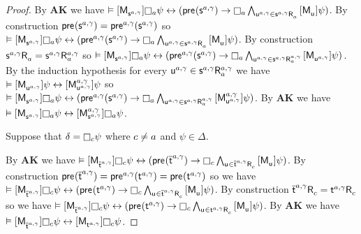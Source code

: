 \begin{proof}
By {\bf AK} we have $\entails \actionA{\aPModel{\aStateS[\agentA, \gamma]}} \necessaryA \psi \iff (\aPrecondition(\aStateS[\agentA, \gamma]) \implies \necessaryA \bigwedge_{\aStateU[\agentA, \gamma] \in \aSuccessorsA{\aStateS[\agentA, \gamma]}} \actionA{\aPModel{\aStateU}} \psi)$.
By construction $\aPrecondition(\aStateS[\agentA, \gamma]) = \aPrecondition[\agentA, \gamma](\aStateS[\agentA, \gamma])$ so $\entails \actionA{\aPModel{\aStateS[\agentA, \gamma]}} \necessaryA \psi \iff (\aPrecondition[\agentA, \gamma](\aStateS[\agentA, \gamma]) \implies \necessaryA \bigwedge_{\aStateU[\agentA, \gamma] \in \aSuccessorsA{\aStateS[\agentA, \gamma]}} \actionA{\aPModel{\aStateU}} \psi)$.
By construction $\aSuccessorsA{\aStateS[\agentA, \gamma]} = \aSuccessorsA[\agentA, \gamma]{\aStateS[\agentA, \gamma]}$ so $\entails \actionA{\aPModel{\aStateS[\agentA, \gamma]}} \necessaryA \psi \iff (\aPrecondition[\agentA, \gamma](\aStateS[\agentA, \gamma]) \implies \necessaryA \bigwedge_{\aStateU[\agentA, \gamma] \in \aSuccessorsA[\agentA, \gamma]{\aStateS[\agentA, \gamma]}} \actionA{\aPModel{\aStateU[\agentA, \gamma]}} \psi)$.
By the induction hypothesis for every $\aStateU[\agentA, \gamma] \in \aSuccessorsA[\agentA, \gamma]{\aStateS[\agentA, \gamma]}$ we have $\entails \actionA{\aPModel{\aStateU[\agentA, \gamma]}} \psi \iff \actionA{\aPModel[\agentA, \gamma]{\aStateU[\agentA, \gamma]}} \psi$ so $\entails \actionA{\aPModel{\aStateS[\agentA, \gamma]}} \necessaryA \psi \iff (\aPrecondition[\agentA, \gamma](\aStateS[\agentA, \gamma]) \implies \necessaryA \bigwedge_{\aStateU[\agentA, \gamma] \in \aSuccessorsA[\agentA, \gamma]{\aStateS[\agentA, \gamma]}} \actionA{\aPModel[\agentA, \gamma]{\aStateU[\agentA, \gamma]}} \psi)$.
By {\bf AK} we have $\entails \actionA{\aPModel{\aStateS[\agentA, \gamma]}} \necessaryA \psi \iff \actionA{\aPModel[\agentA, \gamma]{\aStateS[\agentA, \gamma]}} \necessaryA \psi$.

Suppose that $\delta = \necessaryC \psi$ where $\agentC \neq \agentA$ and $\psi \in \Delta$.

By {\bf AK} we have $\entails \actionA{\aPModel{\aPStateT[\agentA, \gamma]}} \necessaryC \psi \iff (\aPrecondition(\aPStateT[\agentA, \gamma]) \implies \necessaryC \bigwedge_{\aStateU \in \aSuccessorsC{\aPStateT[\agentA, \gamma]}} \actionA{\aPModel{\aStateU}} \psi)$.
By construction $\aPrecondition(\aPStateT[\agentA, \gamma])= \aPrecondition[\agentA, \gamma](\aStateT[\agentA, \gamma]) = \aPrecondition(\aStateT[\agentA, \gamma])$ so we have $\entails \actionA{\aPModel{\aPStateT[\agentA, \gamma]}} \necessaryC \psi \iff (\aPrecondition(\aStateT[\agentA, \gamma]) \implies \necessaryC \bigwedge_{\aStateU \in \aSuccessorsC{\aPStateT[\agentA, \gamma]}} \actionA{\aPModel{\aStateU}} \psi)$.
By construction $\aSuccessorsC{\aPStateT[\agentA, \gamma]} = \aSuccessorsC{\aStateT[\agentA, \gamma]}$ so we have $\entails \actionA{\aPModel{\aPStateT[\agentA, \gamma]}} \necessaryC \psi \iff (\aPrecondition(\aStateT[\agentA, \gamma]) \implies \necessaryC \bigwedge_{\aStateU \in \aSuccessorsC{\aStateT[\agentA, \gamma]}} \actionA{\aPModel{\aStateU}} \psi)$.
By {\bf AK} we have $\entails \actionA{\aPModel{\aPStateT[\agentA, \gamma]}} \necessaryC \psi \iff \actionA{\aPModel{\aStateT[\agentA, \gamma]}} \necessaryC \psi$.


\end{proof}
